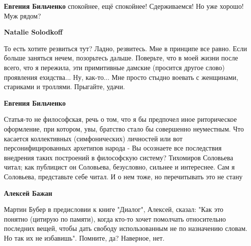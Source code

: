 \begin{itemize}
\begin{itemize}
 
\textbf{Евгения Бильченко} спокойнее, ещё спокойнее! Сдерживаемся! Но уже хорошо! Муж рядом?

 
\textbf{Natalie Solodkoff} 

То есть хотите резвиться тут? Ладно, резвитесь. Мне в принципе все равно. Если
больше заняться нечем, позорьтесь дальше. Поверьте, что в моей жизни после
всего, что я пережила, эти примитивные дамские (просится другое слово)
проявления ехидства... Ну, как-то... Мне просто стыдно воевать с женщинами,
стариками и троллями. Прыгайте, удачи.


 
\textbf{Евгения Бильченко} 

Статья-то не философская, речь о том, что я бы предпочел иное риторическое
оформление, при котором, увы, братство стало бы совершенно неуместным. Что
касается коллективных (симфонических) личностей или вот персонифицированных
архетипов народа - Вы осознаете все последствия внедрения таких построений в
философскую систему? Тихомиров Соловьева читал; как публицист он Соловьева,
безусловно, сильнее и интереснее. Сам я Соловьева, представьте себе читал. И о
нем тоже, но перечитывать это не стану

 
\textbf{Алексей Бажан} 

Мартин Бубер в предисловии к книге "Диалог", Алексей, сказал: "Как это понятно
(цитирую по памяти), когда кто-то хочет помолчать относительно последних вещей,
чтобы дать свободу использованным не по назначению словам. Но так их не
избавишь". Помните, да? Наверное, нет. 


\end{itemize}
\end{itemize}
